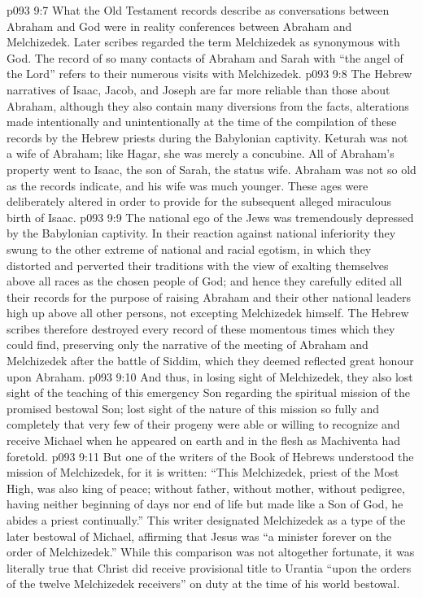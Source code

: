 \vs p093 9:7 What the Old Testament records describe as conversations between Abraham and God were in reality conferences between Abraham and Melchizedek. Later scribes regarded the term Melchizedek as synonymous with God. The record of so many contacts of Abraham and Sarah with “the angel of the Lord” refers to their numerous visits with Melchizedek.
\vs p093 9:8 The Hebrew narratives of Isaac, Jacob, and Joseph are far more reliable than those about Abraham, although they also contain many diversions from the facts, alterations made intentionally and unintentionally at the time of the compilation of these records by the Hebrew priests during the Babylonian captivity. Keturah was not a wife of Abraham; like Hagar, she was merely a concubine. All of Abraham’s property went to Isaac, the son of Sarah, the status wife. Abraham was not so old as the records indicate, and his wife was much younger. These ages were deliberately altered in order to provide for the subsequent alleged miraculous birth of Isaac.
\vs p093 9:9 \pc The national ego of the Jews was tremendously depressed by the Babylonian captivity. In their reaction against national inferiority they swung to the other extreme of national and racial egotism, in which they distorted and perverted their traditions with the view of exalting themselves above all races as the chosen people of God; and hence they carefully edited all their records for the purpose of raising Abraham and their other national leaders high up above all other persons, not excepting Melchizedek himself. The Hebrew scribes therefore destroyed every record of these momentous times which they could find, preserving only the narrative of the meeting of Abraham and Melchizedek after the battle of Siddim, which they deemed reflected great honour upon Abraham.
\vs p093 9:10 And thus, in losing sight of Melchizedek, they also lost sight of the teaching of this emergency Son regarding the spiritual mission of the promised bestowal Son; lost sight of the nature of this mission so fully and completely that very few of their progeny were able or willing to recognize and receive Michael when he appeared on earth and in the flesh as Machiventa had foretold.
\vs p093 9:11 But one of the writers of the Book of Hebrews understood the mission of Melchizedek, for it is written: “This Melchizedek, priest of the Most High, was also king of peace; without father, without mother, without pedigree, having neither beginning of days nor end of life but made like a Son of God, he abides a priest continually.” This writer designated Melchizedek as a type of the later bestowal of Michael, affirming that Jesus was “a minister forever on the order of Melchizedek.” While this comparison was not altogether fortunate, it was literally true that Christ did receive provisional title to Urantia “upon the orders of the twelve Melchizedek receivers” on duty at the time of his world bestowal.
